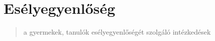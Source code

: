 \section{Esélyegyenlőség}\label{esuxe9lyegyenlux151suxe9g}

\begin{quote}
      a gyermekek, tanulók esélyegyenlőségét szolgáló intézkedések
\end{quote}
